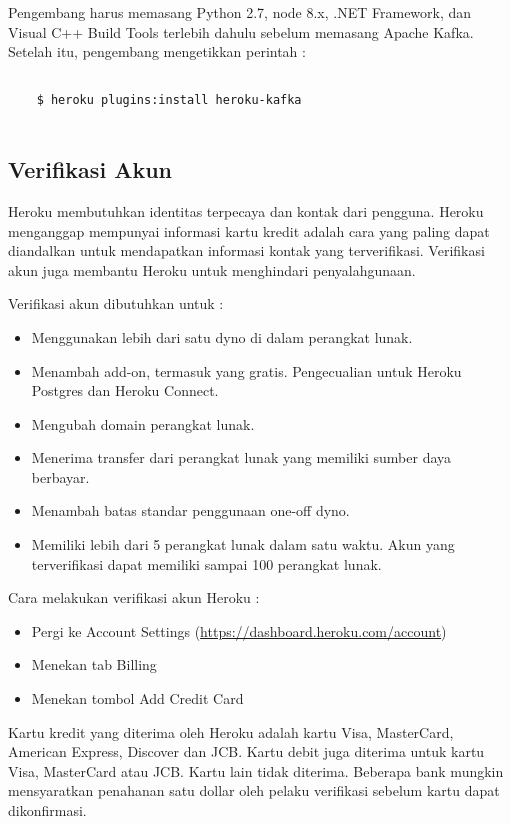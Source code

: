 Pengembang harus memasang Python 2.7, node 8.x, .NET Framework, dan Visual C++ Build Tools terlebih dahulu sebelum memasang Apache Kafka. Setelah itu, pengembang mengetikkan perintah :
\begin{lstlisting}
	
	$ heroku plugins:install heroku-kafka
	
\end{lstlisting}

\subsection{Verifikasi Akun}
Heroku membutuhkan identitas terpecaya dan kontak dari pengguna. Heroku menganggap mempunyai informasi kartu kredit adalah cara yang paling dapat diandalkan untuk mendapatkan informasi kontak yang terverifikasi. Verifikasi akun juga membantu Heroku untuk menghindari penyalahgunaan.

Verifikasi akun dibutuhkan untuk :
\begin{itemize}
\item Menggunakan lebih dari satu dyno di dalam perangkat lunak.
\item Menambah add-on, termasuk yang gratis. Pengecualian untuk Heroku Postgres dan Heroku Connect.
\item Mengubah domain perangkat lunak.
\item Menerima transfer dari perangkat lunak yang memiliki sumber daya berbayar.
\item Menambah batas standar penggunaan one-off dyno.
\item Memiliki lebih dari 5 perangkat lunak dalam satu waktu.  Akun yang terverifikasi dapat memiliki sampai 100 perangkat lunak.
\end{itemize}

Cara melakukan verifikasi akun Heroku :
\begin{itemize}
\item Pergi ke Account Settings (\url{https://dashboard.heroku.com/account})
\item Menekan tab Billing
\item Menekan tombol Add Credit Card
\end{itemize}

Kartu kredit yang diterima oleh Heroku adalah kartu Visa, MasterCard, American Express, Discover dan JCB. Kartu debit juga diterima untuk kartu Visa, MasterCard atau JCB. Kartu lain tidak diterima. Beberapa bank mungkin mensyaratkan penahanan satu dollar oleh pelaku verifikasi sebelum kartu dapat dikonfirmasi.

